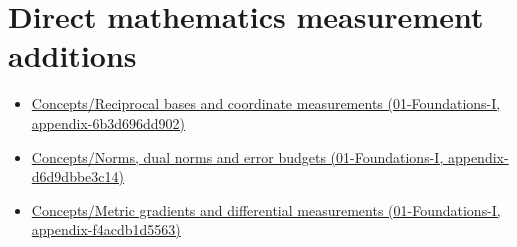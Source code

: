 \section{Direct mathematics measurement additions}\label{appendix-a6d556a4ef50-direct-mathematics-measurement-additions}

\begin{itemize}
\tightlist
\item
  \href{../01-Foundations-I/main.pdf\#nameddest=appendix-6b3d696dd902}{Concepts/Reciprocal bases and coordinate measurements (01-Foundations-I, appendix-6b3d696dd902)}
\item
  \href{../01-Foundations-I/main.pdf\#nameddest=appendix-d6d9dbbe3c14}{Concepts/Norms, dual norms and error budgets (01-Foundations-I, appendix-d6d9dbbe3c14)}
\item
  \href{../01-Foundations-I/main.pdf\#nameddest=appendix-f4acdb1d5563}{Concepts/Metric gradients and differential measurements (01-Foundations-I, appendix-f4acdb1d5563)}
\end{itemize}
